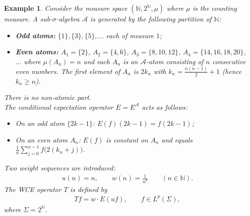 \documentclass{amsart}
\newtheorem{exam}[thm]{Example}
\theoremstyle{definition}\newtheorem{defn}[thm]{Definition}
\theoremstyle{remark}
\numberwithin{equation}{section}
\begin{document}
\begin{exam}
	Consider the measure space $(\mathbb{N}, 2^{\mathbb{N}}, \mu)$ where $\mu$ is the counting measure.  
	A sub‑$\sigma$-algebra $\mathcal{A}$ is generated by the following partition of $\mathbb{N}$:
	\begin{itemize}
		\item \textbf{Odd atoms:} $\{1\}, \{3\}, \{5\}, \dots$ each of measure $1$;
		\item \textbf{Even atoms:}  
		$A_1 = \{2\}$, $A_2 = \{4,6\}$, $A_3 = \{8,10,12\}$, $A_4 = \{14,16,18,20\}$, $\dots$  
		where $\mu(A_n)=n$ and each $A_n$ is an $\mathcal{A}$-atom consisting of $n$ consecutive even numbers.  
		The first element of $A_n$ is $2k_n$ with $k_n = \frac{n(n-1)}{2}+1$ (hence $k_n \ge n$).
	\end{itemize}
	There is no non‑atomic part.\\
	The conditional expectation operator $E = E^{\mathcal{A}}$ acts as follows:  
	
	\begin{itemize}
		\item On an odd atom $\{2k-1\}$: $E(f)(2k-1)=f(2k-1)$;
		\item On an even atom $A_n$: $E(f)$ is constant on $A_n$ and equals  
		$\displaystyle \frac{1}{n}\sum_{j=0}^{n-1} f\bigl(2(k_n+j)\bigr)$.
	\end{itemize}
	Two weight sequences are introduced:  
	\begin{align*}
		u(n)=n,\qquad w(n)=\frac{1}{n^{3}}\qquad (n\in\mathbb{N}).
	\end{align*}
	The WCE operator $T$ is defined by  
	\begin{align*}
	Tf = w\cdot E(uf),\qquad f\in L^{p}(\Sigma),
	\end{align*}
	where $\Sigma = 2^{\mathbb{N}}$.
	

\end{exam}
\end{document}
